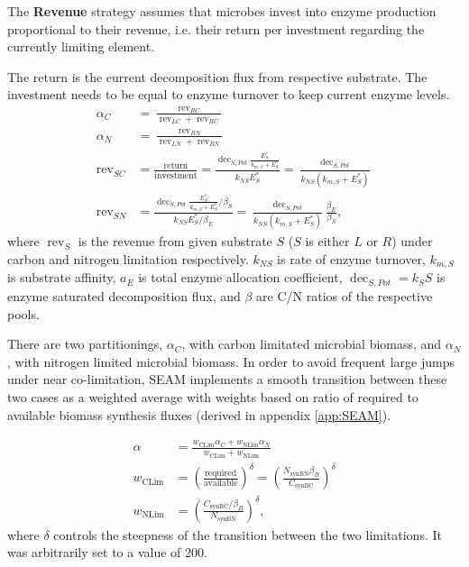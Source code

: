 The \textbf{Revenue} strategy assumes that microbes invest into enzyme
production proportional to their revenue, i.e. their return per investment
regarding the currently limiting element.

The return is the current decomposition flux from respective substrate. The
investment needs to be equal to enzyme turnover to keep current enzyme levels.
% 
\begin{subequations}
\label{eq:allocRev}
\begin{align}
\alpha_C &= \frac{\operatorname{rev}_{RC}}{\operatorname{rev}_{LC} + \operatorname{rev}_{RC}} \\
\alpha_N &= \frac{\operatorname{rev}_{RN}}{\operatorname{rev}_{LN} + \operatorname{rev}_{RN}} \\
\operatorname{rev}_{SC} &= \frac{\text{return}}{\text{investment}} 
= \frac{\operatorname{dec}_{S,Pot} \frac{E_S^*}{k_{m,S} + E_S^*}} {k_{NS}E_S^*} 
= \frac{\operatorname{dec}_{S,Pot}} {k_{NS}(k_{m,S} + E_S^*)} \\ 
\operatorname{rev}_{SN} &= \frac{\operatorname{dec}_{S,Pot}
\frac{E_S^*}{k_{m,S} + E_S^*} / \beta_S} {k_{NS} E_S^* / \beta_E} 
= \frac{\operatorname{dec}_{S,Pot}}{k_{NS} (k_{m,S} + E_S^*)}
\frac{\beta_E}{\beta_S}
\text{,} 
\end{align}
\end{subequations}
where $\operatorname{rev}_S$ is the revenue from given substrate $S$ ($S$ is either $L$ or $R$)
under carbon and nitrogen limitation respectively.
$k_{NS}$ is rate of enzyme turnover, $k_{m,S}$ is substrate affinity, $a_E$ is
total enzyme allocation coefficient, $\operatorname{dec}_{S,Pot} = k_S S$ is
enzyme saturated decomposition flux, and $\beta$ are C/N ratios of the
respective pools.

There are two partitionings, $\alpha_C$, with carbon limitated microbial
biomass, and $\alpha_N$, with nitrogen limited microbial biomass. In order to
avoid frequent large jumps under near co-limitation, SEAM implements a smooth
transition between these two cases as a weighted average with weights based
on ratio of required to available biomass synthesis fluxes (derived in
appendix \ref{app:SEAM}).

\begin{subequations}
\label{eq:allocRev}
\begin{align}
\alpha &= \frac{w_{\operatorname{CLim}} \alpha_C + w_{\operatorname{NLim}}
\alpha_N}{w_{\operatorname{CLim}}  + w_{\operatorname{NLim}} } 
\\
w_{\operatorname{CLim}} &= \left( \frac{\text{required}}{\text{available}}
\right)^\delta 
= \left( \frac{ N_{\operatorname{synBN}} \beta_B }{ C_{\operatorname{synBC}} }
\right)^\delta
\\
w_{\operatorname{NLim}} &= \left( \frac{ C_{\operatorname{synBC}} / \beta_B }{
N_{\operatorname{synBN}} } \right)^\delta
\text{,} 
\end{align}
\end{subequations}
where $\delta$ controls the steepness of the transition between the two
limitations. It was arbitrarily set to a value of 200.



